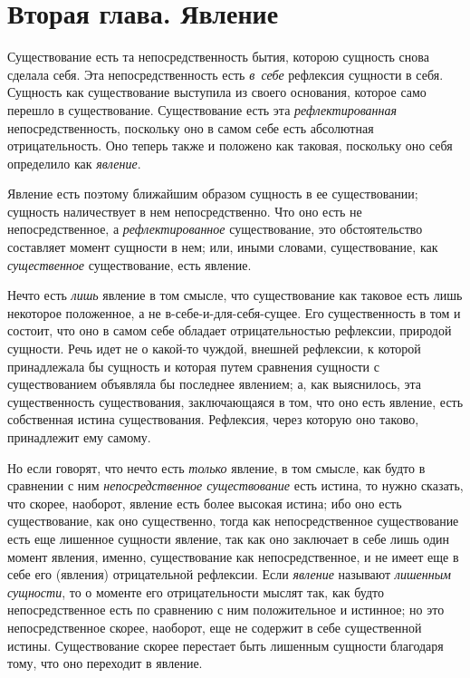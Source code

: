 \chapter[{\em Вторая глава} Явление]{Вторая глава. Явление}

Существование есть та непосредственность бытия,
которою сущность снова сделала себя. Эта непосредственность есть
{\em в~себе} рефлексия сущности в себя. Сущность как
существование выступила из своего основания, которое само перешло в
существование. Существование есть эта
{\em рефлектированная} непосредственность, поскольку
оно в самом себе есть абсолютная отрицательность. Оно теперь также и
положено как таковая, поскольку оно себя определило как
{\em явление}.

Явление есть поэтому ближайшим образом сущность в ее существовании; сущность
наличествует в нем непосредственно. Что оно есть не непосредственное, а
{\em рефлектированное} существование, это
обстоятельство составляет момент сущности в нем; или, иными словами,
существование, как {\em существенное} существование,
есть явление.

Нечто есть {\em лишь} явление в том смысле, что
существование как таковое есть лишь некоторое положенное, а не
в-себе-и-для-себя-сущее. Его существенность в том и состоит, что оно в
самом себе обладает отрицательностью рефлексии, природой сущности. Речь
идет не о какой-то чуждой, внешней рефлексии, к которой принадлежала бы
сущность и которая путем сравнения сущности с существованием объявляла бы
последнее явлением; а, как выяснилось, эта существенность существования,
заключающаяся в том, что оно есть явление, есть собственная истина
существования. Рефлексия, через которую оно таково, принадлежит ему самому.

Но если говорят, что нечто есть {\em только} явление, в
том смысле, как будто в сравнении с ним
{\em непосредственное существование} есть истина, то
нужно сказать, что скорее, наоборот, явление есть более высокая истина; ибо
оно есть существование, как оно существенно, тогда как непосредственное
существование есть еще лишенное сущности явление, так как оно заключает в
себе лишь один момент явления, именно, существование как непосредственное,
и не имеет еще в себе его (явления) отрицательной рефлексии. Если
{\em явление} называют
{\em лишенным сущности}, то о моменте его
отрицательности мыслят так, как будто непосредственное есть по сравнению с
ним положительное и истинное; но это непосредственное скорее, наоборот, еще
не содержит в себе существенной истины. Существование скорее перестает быть
лишенным сущности благодаря тому, что оно переходит в явление.

